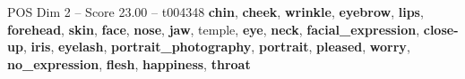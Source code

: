 \begin{textsample}{POS Dim 2 – Score 23.00 – t004348}  \label{ex:f2_pos_014}
\textbf{chin}, \textbf{cheek}, \textbf{wrinkle}, \textbf{eyebrow}, \textbf{lips}, \textbf{forehead}, \textbf{skin}, \textbf{face}, \textbf{nose}, \textbf{jaw}, temple, \textbf{eye}, \textbf{neck}, \textbf{facial\_expression}, \textbf{close-up}, \textbf{iris}, \textbf{eyelash}, \textbf{portrait\_photography}, \textbf{portrait}, \textbf{pleased}, \textbf{worry}, \textbf{no\_expression}, \textbf{flesh}, \textbf{happiness}, \textbf{throat}

\end{textsample}
